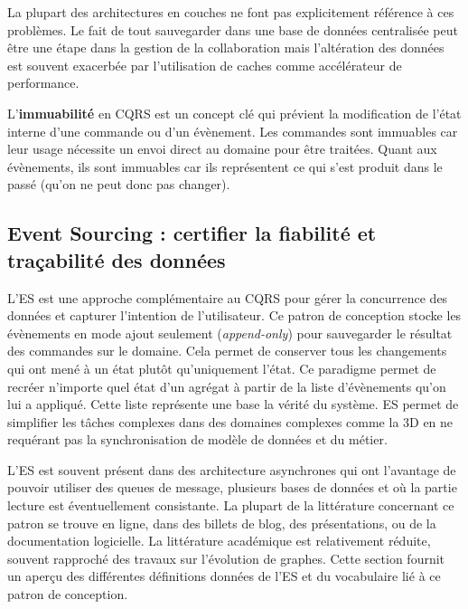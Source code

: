 La plupart des architectures en couches ne font pas explicitement référence à ces 
problèmes. Le fait de tout sauvegarder dans une base de données centralisée peut 
être une étape dans la gestion de la collaboration mais l'altération des données est 
souvent exacerbée par l'utilisation de caches comme accélérateur de performance.

L'\textbf{immuabili\-té} en \gls{CQRS} est un concept clé qui prévient la  
modification de l'état interne d'une commande ou d'un évènement. Les 
commandes sont immuables car leur usage nécessite un envoi direct au domaine 
pour être traitées. Quant aux évènements, ils sont immuables car ils représentent 
ce qui s'est produit dans le passé (qu'on ne peut donc pas changer). 


	
	\subsection{Event Sourcing : certifier la fiabilité et traçabilité des données}
	\label{sec:es}
	L'\gls{ES} est une approche complémentaire au \gls{CQRS} pour gérer la 
	concurrence des données et capturer l'intention de l'utilisateur. Ce patron de 
	conception stocke les évènements en mode ajout seulement 
	(\textit{append-only}) pour sauvegarder le résultat des commandes sur le 
	domaine. Cela permet de conserver tous les changements qui ont mené à un 
	état plutôt qu'uniquement l'état. Ce paradigme permet de recréer n'importe quel 
	état d'un agrégat à partir de la liste d'évènements qu'on lui a appliqué. Cette 
	liste représente une base la vérité du système. 
	\gls{ES} permet de simplifier les tâches complexes dans des 
	domaines complexes comme la 3D en ne requérant pas la synchronisation de 
	modèle de données et du métier. 
	
	L'\gls{ES} est souvent présent dans des architecture asynchrones qui ont 
	l'avantage de pouvoir utiliser des queues de message, plusieurs bases de 
	données et où la partie lecture est éventuellement consistante.
	La plupart de la littérature concernant ce patron se trouve en ligne, dans des 
	billets de blog, des présentations, ou de la documentation logicielle. La 
	littérature académique est relativement réduite, souvent rapproché des travaux 
	sur l'évolution de graphes. Cette section fournit un aperçu des différentes 
	définitions données de l'\gls{ES} et du vocabulaire lié à ce patron de conception.
	
